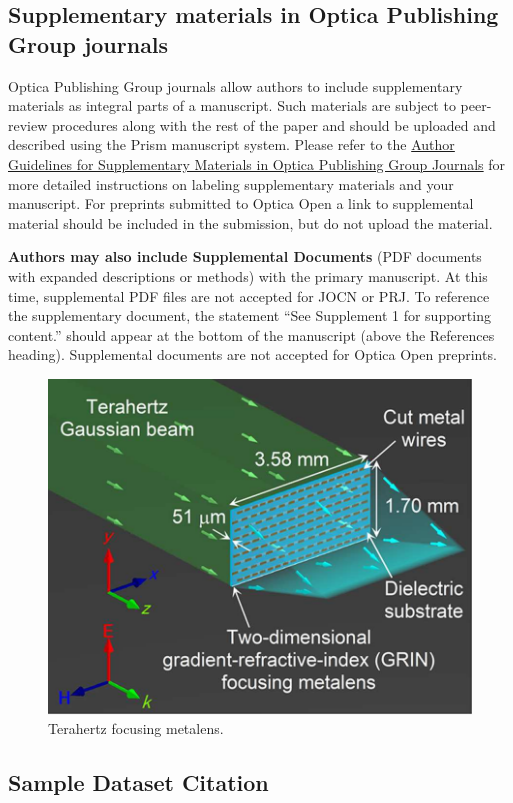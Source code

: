 \documentclass[9pt,twocolumn,twoside]{opticajnl}
\begin{document}
\subsection{Supplementary materials in Optica Publishing Group journals}
Optica Publishing Group journals allow authors to include supplementary materials as integral parts of a manuscript. Such materials are subject to peer-review procedures along with the rest of the paper and should be uploaded and described using the Prism manuscript system. Please refer to the \href{https://opg.optica.org/submit/style/supplementary_materials.cfm}{Author Guidelines for Supplementary Materials in Optica Publishing Group Journals} for more detailed instructions on labeling supplementary materials and your manuscript. For preprints submitted to Optica Open a link to supplemental material should be included in the submission, but do not upload the material.

\textbf{Authors may also include Supplemental Documents} (PDF documents with expanded descriptions or methods) with the primary manuscript. At this time, supplemental PDF files are not accepted for JOCN or PRJ. To reference the supplementary document, the statement ``See Supplement 1 for supporting content.'' should appear at the bottom of the manuscript (above the References heading). Supplemental documents are not accepted for Optica Open preprints.

\begin{figure}[ht!]
  \centering\includegraphics{opticafig2}
  \caption{Terahertz focusing metalens.}
\end{figure}


\subsection{Sample Dataset Citation}
\end{document}
